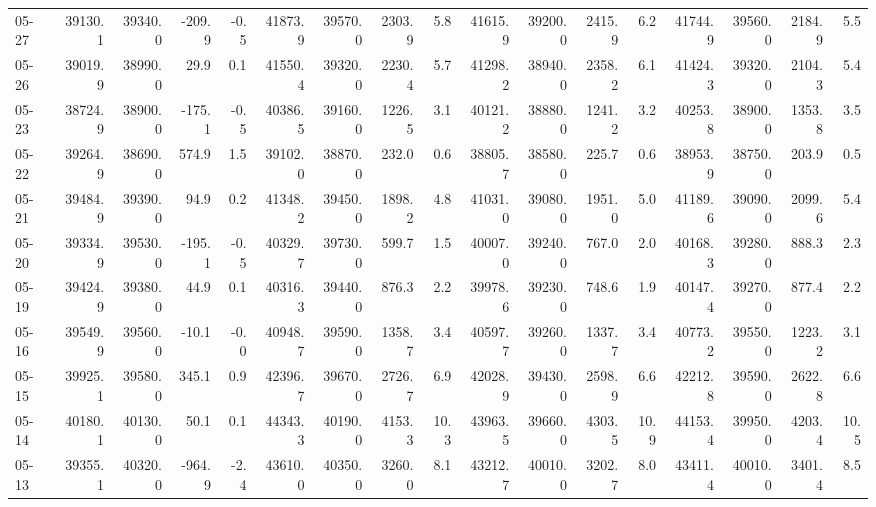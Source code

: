 \begin{threeparttable}
{\begin{tabular}{lrrrrrrrrrrrrrrrr}
  05-27 & 39130.1 & 39340.0 &     -209.9 &           -0.5 & 41873.9 & 39570.0 &     2303.9 &            5.8 & 41615.9 & 39200.0 &     2415.9 &            6.2 & 41744.9 & 39560.0 &      2184.9 &              5.5 \\
  05-26 & 39019.9 & 38990.0 &       29.9 &            0.1 & 41550.4 & 39320.0 &     2230.4 &            5.7 & 41298.2 & 38940.0 &     2358.2 &            6.1 & 41424.3 & 39320.0 &      2104.3 &              5.4 \\
  05-23 & 38724.9 & 38900.0 &     -175.1 &           -0.5 & 40386.5 & 39160.0 &     1226.5 &            3.1 & 40121.2 & 38880.0 &     1241.2 &            3.2 & 40253.8 & 38900.0 &      1353.8 &              3.5 \\
  05-22 & 39264.9 & 38690.0 &      574.9 &            1.5 & 39102.0 & 38870.0 &      232.0 &            0.6 & 38805.7 & 38580.0 &      225.7 &            0.6 & 38953.9 & 38750.0 &       203.9 &              0.5 \\
  05-21 & 39484.9 & 39390.0 &       94.9 &            0.2 & 41348.2 & 39450.0 &     1898.2 &            4.8 & 41031.0 & 39080.0 &     1951.0 &            5.0 & 41189.6 & 39090.0 &      2099.6 &              5.4 \\
  05-20 & 39334.9 & 39530.0 &     -195.1 &           -0.5 & 40329.7 & 39730.0 &      599.7 &            1.5 & 40007.0 & 39240.0 &      767.0 &            2.0 & 40168.3 & 39280.0 &       888.3 &              2.3 \\
  05-19 & 39424.9 & 39380.0 &       44.9 &            0.1 & 40316.3 & 39440.0 &      876.3 &            2.2 & 39978.6 & 39230.0 &      748.6 &            1.9 & 40147.4 & 39270.0 &       877.4 &              2.2 \\
  05-16 & 39549.9 & 39560.0 &      -10.1 &           -0.0 & 40948.7 & 39590.0 &     1358.7 &            3.4 & 40597.7 & 39260.0 &     1337.7 &            3.4 & 40773.2 & 39550.0 &      1223.2 &              3.1 \\
  05-15 & 39925.1 & 39580.0 &      345.1 &            0.9 & 42396.7 & 39670.0 &     2726.7 &            6.9 & 42028.9 & 39430.0 &     2598.9 &            6.6 & 42212.8 & 39590.0 &      2622.8 &              6.6 \\
  05-14 & 40180.1 & 40130.0 &       50.1 &            0.1 & 44343.3 & 40190.0 &     4153.3 &           10.3 & 43963.5 & 39660.0 &     4303.5 &           10.9 & 44153.4 & 39950.0 &      4203.4 &             10.5 \\
  05-13 & 39355.1 & 40320.0 &     -964.9 &           -2.4 & 43610.0 & 40350.0 &     3260.0 &            8.1 & 43212.7 & 40010.0 &     3202.7 &            8.0 & 43411.4 & 40010.0 &      3401.4 &              8.5 \\

\end{tabular}}
\end{threeparttable}
